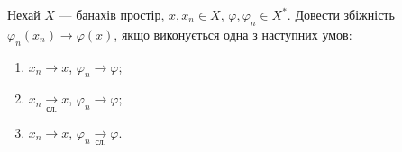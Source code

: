 \begin{exercise}
    Нехай $X$ --- банахів простір, $x, x_n \in X$, $\varphi, \varphi_n \in X^{*}$.
    Довести збіжність $\varphi_n(x_n) \to \varphi(x)$, якщо виконується одна з наступних умов:
    \begin{enumerate}
        \item $x_n \to x$, $\varphi_n \to \varphi$;
        \item $x_n \underset{\text{сл.}}{\rightarrow} x$, $\varphi_n \to \varphi$;
        \item $x_n \to x$, $\varphi_n \underset{\text{сл.}}\rightarrow \varphi$.
    \end{enumerate}
\end{exercise}
